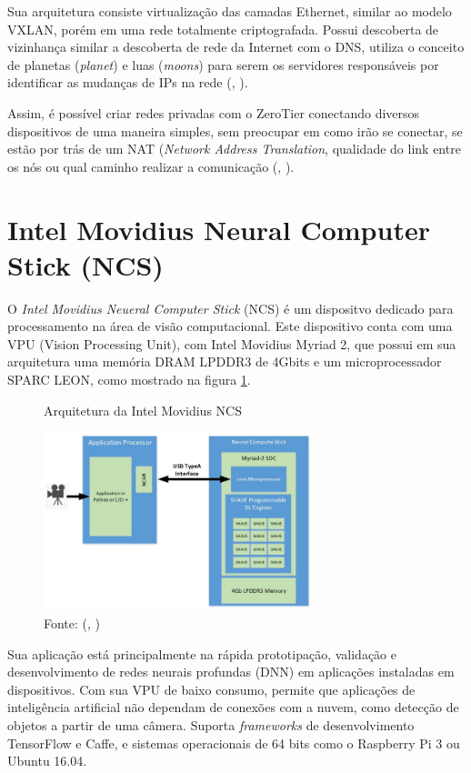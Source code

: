 \documentclass[]{politex}
\begin{document}
Sua arquitetura consiste virtualização das camadas Ethernet, similar ao modelo VXLAN, porém em uma rede totalmente criptografada. Possui descoberta de vizinhança similar a descoberta de rede da Internet com o DNS, utiliza o conceito de planetas (\textit{planet}) e luas (\textit{moons}) para serem os servidores responsáveis por identificar as mudanças de IPs na rede (, \citeyear{zerotier}).

Assim, é possível criar redes privadas com o ZeroTier conectando diversos dispositivos de uma maneira simples, sem preocupar em como irão se conectar, se estão por trás de um NAT (\textit{Network Address Translation}, qualidade do link entre os nós ou qual caminho realizar a comunicação (, \citeyear{zerotier}).

\section{Intel Movidius Neural Computer Stick (NCS)}
O \textit{Intel Movidius Neueral Computer Stick} (NCS) é um dispositvo dedicado para processamento na área de visão computacional. Este dispositivo conta com uma VPU (Vision Processing Unit), com Intel Movidius Myriad 2, que possui em sua arquitetura uma memória DRAM LPDDR3 de 4Gbits e um microprocessador SPARC LEON, como mostrado na figura \ref{fig:intel_movidius}.

\begin{figure}[H]
    \centering
    \caption{Arquitetura da Intel Movidius NCS}
    \includegraphics[width=0.7\textwidth]{intel_movidius}
    \caption*{Fonte: (, \citeyear{intel_movidius})}
    \label{fig:intel_movidius}
\end{figure}

Sua aplicação está principalmente na rápida prototipação, validação e desenvolvimento de redes neurais profundas (DNN) em aplicações instaladas em dispositivos. Com sua VPU de baixo consumo, permite que aplicações de inteligência artificial não dependam de conexões com a nuvem, como detecção de objetos a partir de uma câmera. Suporta \textit{frameworks} de desenvolvimento TensorFlow e Caffe, e sistemas operacionais de 64 bits como o Raspberry Pi 3 ou Ubuntu 16.04.
\end{document}

